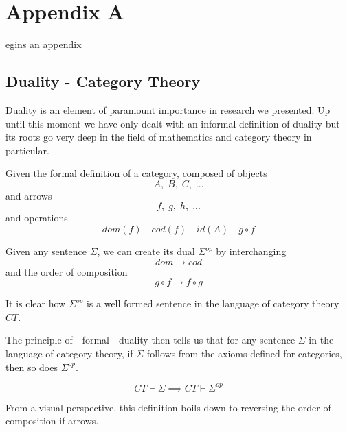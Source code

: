 \chapter{Appendix A}
\label{app:a}

egins an appendix\\

\section{Duality - Category Theory}

Duality is an element of paramount importance in research we presented. Up until this moment we have only dealt with an informal definition of duality but its roots go very deep in the field of mathematics and category theory in particular.

Given the formal definition of a category, composed of objects $$A,\; B,\; C,\; ...$$ and arrows $$f,\; g,\; h,\; ... $$ and operations $$ dom(f) \quad cod(f) \quad id(A) \quad g \circ f $$ 

Given any sentence $ \Sigma $, we can create its dual $ \Sigma^{op} $ by interchanging $$dom \to cod$$ and the order of composition $$ g \circ f \to f \circ g $$ 

It is clear how $ \Sigma^{op} $ is a well formed sentence in the language of category theory $ CT $.

The principle of - formal - duality then tells us that for any sentence $ \Sigma $ in the language of category theory, if $ \Sigma $ follows from the axioms defined for categories, then so does $ \Sigma^{op}$.

\[ CT \vdash \Sigma \implies CT \vdash \Sigma^{op} \]

From a visual perspective, this definition boils down to reversing the order of composition if arrows. 

\begin{center}
\begin{minipage}{.3\textwidth}
\end{minipage}
\begin{minipage}{.3\textwidth}
\end{minipage}
\end{center}

